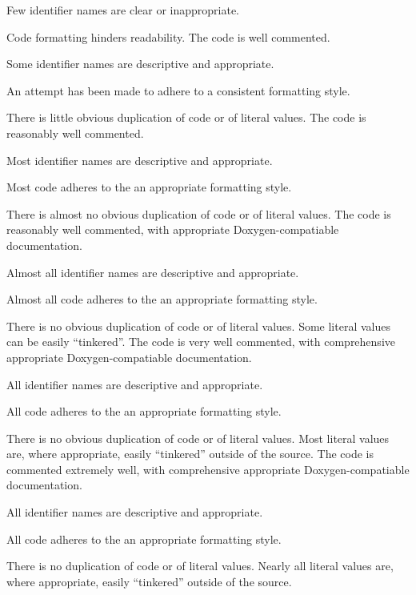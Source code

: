 \documentclass{../fal_assignment}
\begin{document}
\begin{markingrubric}
            \par Few identifier names are clear or inappropriate.
            \par Code formatting hinders readability.
        \grade The code is well commented.
            \par Some identifier names are descriptive and appropriate.
            \par An attempt has been made to adhere to a consistent formatting style.
             \par There is little obvious duplication of code or of literal values.           
        \grade The code is reasonably well commented.
            \par Most identifier names are descriptive and appropriate.
            \par Most code adheres to the an appropriate formatting style.
             \par There is almost no obvious duplication of code or of literal values.   
        \grade The code is reasonably well commented, with appropriate Doxygen-compatiable documentation.
            \par Almost all identifier names are descriptive and appropriate.
            \par Almost all code adheres to the an appropriate formatting style.
             \par There is no obvious duplication of code or of literal values. Some literal values can be easily ``tinkered''. 
        \grade The code is very well commented, with comprehensive appropriate Doxygen-compatiable documentation.
            \par All identifier names are descriptive and appropriate.
            \par All code adheres to the an appropriate formatting style.
             \par There is no obvious duplication of code or of literal values. Most literal values are, where appropriate, easily ``tinkered'' outside of the source.  
        \grade The code is commented extremely well, with comprehensive appropriate Doxygen-compatiable documentation.
            \par All identifier names are descriptive and appropriate.
            \par All code adheres to the an appropriate formatting style.
            \par There is no duplication of code or of literal values. Nearly all literal values are, where appropriate, easily ``tinkered'' outside of the source.  

\end{markingrubric}
\end{document}
